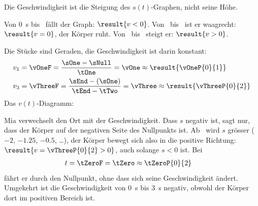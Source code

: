Die Geschwindigkeit ist die Steigung des $s(t)$-Graphen, nicht seine Höhe.
\begin{abcliste}
\abc Von \SI{0}{\second} bis \tOneO\ fällt der Graph: $\result{v<0}$. Von \tOneO\ bis \tTwoO\ ist er waagrecht: $\result{v=0}$, der Körper ruht. Von \tTwoO\ bis \tEndO\ steigt er: $\result{v>0}$.

\abc Die Stücke sind Geraden, die Geschwindigkeit ist darin konstant:
\begin{align}
 v_1 &= \vOneF = \frac{\sOne-\sNull}{\tOne} = \vOne \approx \result{\vOneP{0}{1}} \\
 v_3 &= \vThreeF = \frac{\sEnd-\left(\sOne\right)}{\tEnd-\tTwo} = \vThree \approx \result{\vThreeP{0}{2}}
\end{align}
Das $v(t)$-Diagramm:
\begin{center}
\end{center}
\abc Mia verwechselt den Ort mit der Geschwindigkeit. Dass $s$ negativ ist, sagt nur, dass der Körper auf der negativen Seite des Nullpunkts ist. Ab \tTwoO\ wird $s$ grösser ($-2$, $-1.25$, $-0.5$, \ldots), der Körper bewegt sich also in die positive Richtung: $\result{v = \vThreeP{0}{2} > 0}$, auch solange $s<0$ ist. Bei
\begin{align}
 t &= \tZeroF = \tZero \approx \tZeroP{0}{2}
\end{align}
fährt er durch den Nullpunkt, ohne dass sich seine Geschwindigkeit ändert. Umgekehrt ist die Geschwindigkeit von \SI{0}{\second} bis \SI{3}{\second} negativ, obwohl der Körper dort im positiven Bereich ist.
\end{abcliste}
